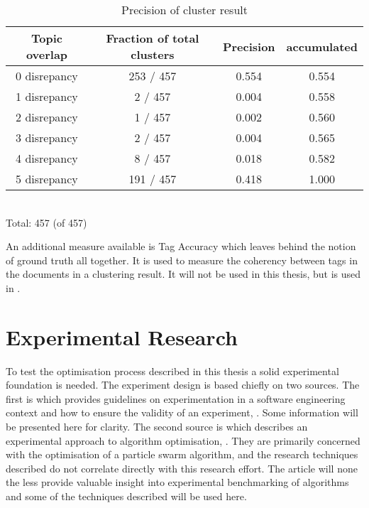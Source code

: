 \begin{table}[htdp]
\footnotesize

\begin{center}
\begin{tabular}{|c|c|c|c|}
\hline
Topic overlap &  Fraction of total clusters & Precision  & accumulated\\ 
\hline
0 disrepancy & 253 / 457 & 0.554 & 0.554 \\
1 disrepancy & 2 / 457 & 0.004 & 0.558 \\
2 disrepancy & 1 / 457 & 0.002 & 0.560\\
3 disrepancy & 2 / 457 & 0.004 & 0.565\\
4 disrepancy & 8 / 457 & 0.018 & 0.582\\
5 disrepancy & 191 / 457 & 0.418 & 1.000\\
\hline
\end{tabular}
\\Total: 457 (of  457)
\end{center}
\caption{Precision of cluster result}
\label{tab:clusterprecision}
\end{table}

An additional measure available is Tag Accuracy which leaves behind the notion of ground truth all together. It is used to measure the coherency between tags in the documents in a clustering result. It will not be used in this thesis, but is used in \cite{Moe2013compact}.

\section{Experimental Research}
\label{ExperimentalResearch}
To test the optimisation process described in this thesis a solid experimental foundation is needed. The experiment design is based chiefly on two sources. The first is  which provides guidelines on experimentation in a software engineering context and how to ensure the validity of an experiment, \parencite{Wohlin2000}. Some information will be presented here for clarity. The second source is  which describes an experimental approach to algorithm optimisation, \parencite{Bartz-Beielstein2004}. They are primarily concerned with the optimisation of a particle swarm algorithm, and the research techniques described do not correlate directly with this research effort. The article will none the less  provide valuable insight into experimental benchmarking of algorithms and some of the techniques described will be used here. 

